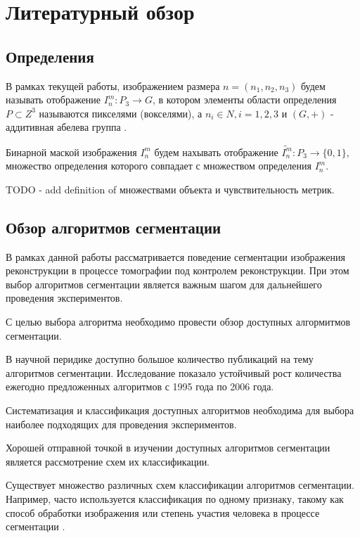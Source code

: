 \section{Литературный обзор}

\subsection{Определения}

В рамках текущей работы, изображением размера \(n=(n_1, n_2, n_3)\) будем называть отображение \(I_n^m : P_3 \rightarrow G\), в котором элементы области определения \(P \subset Z^3\)  называются пикселями (вокселями), а \(n_i \in N, i = 1, 2, 3\) и \((G, +)\) - аддитивная абелева группа \cite{NikolaevPhdthesis}.

Бинарной маской изображения \(I_n^m\) будем нахывать отображение \(\tilde{I_n^m} : P_3 \rightarrow \{0, 1\}\), множество определения которого совпадает с множеством определения \(I_n^m\).

TODO - add definition of множествами объекта и чувствительность метрик.

\subsection{Обзор алгоритмов сегментации}

В рамках данной работы рассматривается поведение сегментации изображения реконструкции в процессе томографии под контролем реконструкции. При этом выбор алгоритмов сегментации является важным шагом для дальнейшего проведения экспериментов.

С целью выбора алгоритма необходимо провести обзор доступных алгормитмов сегментации.

В научной перидике доступно большое количество публикаций на тему алгоритмов сегментации. Исследование \cite{zhang2006advances} показало устойчивый рост количества ежегодно предложенных алгоритмов с 1995 года по 2006 года.

Систематизация и классификация доступных алгоритмов необходима для выбора наиболее подходящих для проведения экспериментов. 

Хорошей отправной точкой в изучении доступных алгоритмов сегментации является рассмотрение схем их классификации. 

Существует множество различных схем классификации алгоритмов сегментации. Например, часто используется классификация по одному признаку, такому как способ обработки изображения или степень участия человека в процессе сегментации \cite{wirjadi2007survey}.

